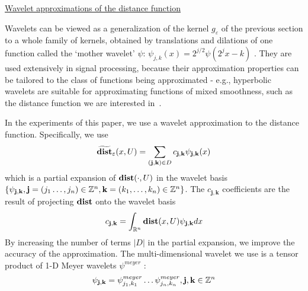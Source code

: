 \underline{Wavelet approximations of the distance function}

Wavelets can be viewed as a generalization of the kernel $g_\varepsilon$ of the previous section to a whole family of kernels, obtained by translations and dilations of one function called the `mother wavelet' $\psi$: $\psi_{j,k}(x) = 2^{j/2}\psi(2^jx - k)$  \cite{MallatBook}.
They are used extensively in signal processing, because their approximation properties can be tailored to the class of functions being approximated - e.g., hyperbolic wavelets are suitable for approximating functions of mixed smoothness, such as the distance function we are interested in~\cite{Heping04_HyperbolicWav}.

In the experiments of this paper, we use a wavelet approximation to the distance function.
Specifically, we use
\[\widetilde{\mathbf{dist}}_\varepsilon(x,U) =  \sum_{\mathbf{(j,k)} \in D}c_{\mathbf{j,k}}\psi_{\mathbf{j,k}}(x)\]
which is a partial expansion of $\mathbf{dist}(\cdot,U)$ in the wavelet basis $\{\psi_{\mathbf{j,k}}, \mathbf{j} = (j_1\ldots,j_n) \in \mathbb{Z}^n, \mathbf{k} = (k_1,\ldots,k_n) \in \mathbb{Z}^n\}$.
The $c_{\mathbf{j,k}}$ coefficients are the result of projecting $\mathbf{dist}$ onto the wavelet basis
\[ c_{\mathbf{j,k}} = \int_{\mathbb{R}^n}\mathbf{dist}(x,U)\psi_{\mathbf{j,k}}dx\]
By increasing the number of terms $|D|$ in the partial expansion, we improve the accuracy of the approximation.
The multi-dimensional wavelet we use is a tensor product of 1-D Meyer wavelets $\psi^{meyer}$ \cite{MallatBook}:
\begin{equation}
\label{eq:multid meyer}
\psi_{\mathbf{j,k}} = \psi_{j_1,k_1}^{meyer}\ldots \psi_{j_n,k_n}^{meyer}, \mathbf{j,k} \in \mathbb{Z}^n
\end{equation}

 
